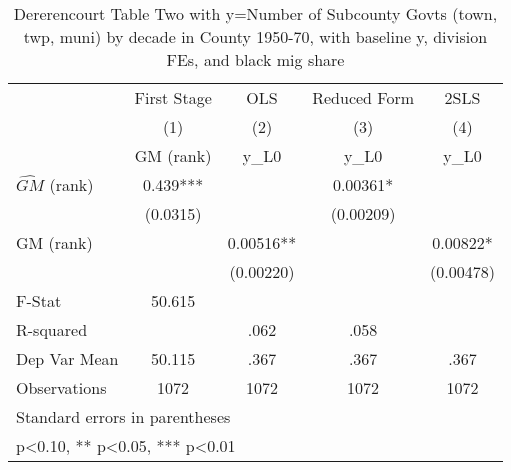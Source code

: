 \begin{table}[htbp]\centering
\def\sym#1{\ifmmode^{#1}\else\(^{#1}\)\fi}
\caption{Dererencourt Table Two with y=Number of Subcounty Govts (town, twp, muni) by decade in County 1950-70, with baseline y, division FEs, and black mig share}
\begin{tabular}{l*{4}{c}}
\toprule
                    & First Stage   &         OLS   &Reduced Form   &        2SLS   \\
                    &\multicolumn{1}{c}{(1)}&\multicolumn{1}{c}{(2)}&\multicolumn{1}{c}{(3)}&\multicolumn{1}{c}{(4)}\\
                    &\multicolumn{1}{c}{GM  (rank)}&\multicolumn{1}{c}{y\_L0}&\multicolumn{1}{c}{y\_L0}&\multicolumn{1}{c}{y\_L0}\\
\midrule
$\hat{GM}$ (rank)   &       0.439***&               &     0.00361*  &               \\
                    &    (0.0315)   &               &   (0.00209)   &               \\
\addlinespace
GM  (rank)          &               &     0.00516** &               &     0.00822*  \\
                    &               &   (0.00220)   &               &   (0.00478)   \\
\midrule
F-Stat              &      50.615   &               &               &               \\
R-squared           &               &        .062   &        .058   &               \\
Dep Var Mean        &      50.115   &        .367   &        .367   &        .367   \\
Observations        &        1072   &        1072   &        1072   &        1072   \\
\bottomrule
\multicolumn{5}{l}{\footnotesize Standard errors in parentheses}\\
\multicolumn{5}{l}{\footnotesize * p<0.10, ** p<0.05, *** p<0.01}\\
\end{tabular}
\end{table}

